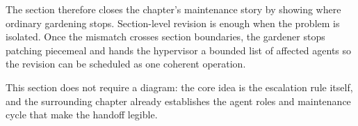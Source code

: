 The section therefore closes the chapter's maintenance story by showing where ordinary gardening stops. Section-level revision is enough when the problem is isolated. Once the mismatch crosses section boundaries, the gardener stops patching piecemeal and hands the hypervisor a bounded list of affected agents so the revision can be scheduled as one coherent operation.

This section does not require a diagram: the core idea is the escalation rule itself, and the surrounding chapter already establishes the agent roles and maintenance cycle that make the handoff legible.
